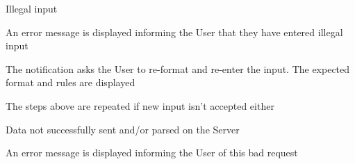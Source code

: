\begin{packed_item}
\begin{packed_item}
					\item[2.a] Illegal input
					\item[] \begin{packed_enum}
						\item An error message is displayed informing the User that they have entered illegal input
						\item The notification asks the User to re-format and re-enter the input. The expected format and rules are displayed
						\item The steps above are repeated if new input isn't accepted either
					\end{packed_enum}
					
					\item[4.a] Data not successfully sent and/or parsed on the Server
					\item[] \begin{packed_enum}
						\item An error message is displayed informing the User of this bad request
					\end{packed_enum}
				\end{packed_item}
				
			\end{packed_item}
		
